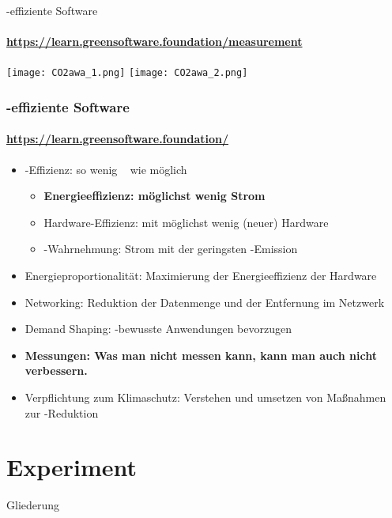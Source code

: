 \begin{frame}{\COz-effiziente Software}
\framesubtitle{\hspace*{\fill}\href{https://learn.greensoftware.foundation/measurement}{https://learn.greensoftware.foundation/measurement}\cite{green_SW_pract_2024}}
		\begin{overprint}
				\texttt{[image: CO2awa\_1.png]}
			 \onslide<2>	  
				\texttt{[image: CO2awa\_2.png]}				
		\end{overprint}
		\label{fig.co2awa}\infoAbb
\end{frame}


\begin{frame}
\frametitle{\COz-effiziente Software}
\framesubtitle{\href{https://learn.greensoftware.foundation//}{https://learn.greensoftware.foundation/}}
\begin{itemize}
     \item \COz-Effizienz: so wenig \COz~  wie möglich
		 \begin{itemize}
         \item \textbf<2->{Energieeffizienz: möglichst wenig Strom} 
         \item Hardware-Effizienz:  mit möglichst wenig (neuer) Hardware
         \item \COz-Wahrnehmung:  Strom mit der geringsten \COz-Emission
     \end{itemize}
		\pause
    \item Energieproportionalität: Maximierung  der  Energieeffizienz der Hardware
    \item Networking: Reduktion der Datenmenge und der Entfernung im  Netzwerk
    \item Demand Shaping:  \COz-bewusste Anwendungen bevorzugen
    \item \textbf<2->{Messungen: Was man nicht messen kann, kann man auch nicht verbessern.} 
		\item Verpflichtung zum Klimaschutz: Verstehen und umsetzen von Maßnahmen zur \COz-Reduktion
\end{itemize}
\end{frame}

\section{Experiment}
\label{s.exp}

\begin{frame}{Gliederung}
\tableofcontents[currentsection]
\end{frame}

